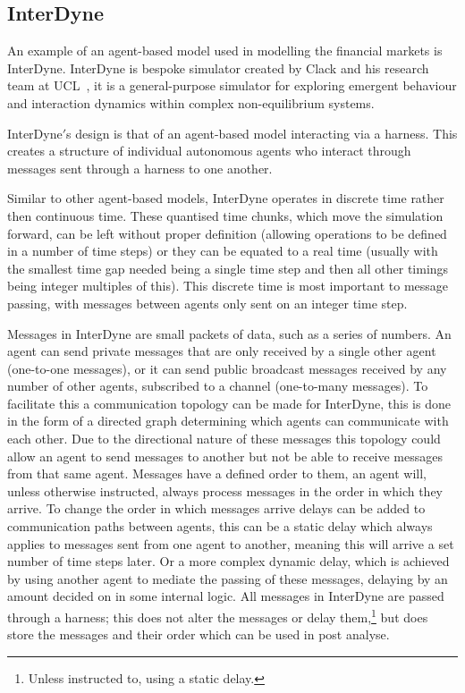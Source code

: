\documentclass{article}
\begin{document}
\subsection{InterDyne} \label{InterDyne_section}
An example of an agent-based model used in modelling the financial markets is InterDyne. InterDyne is bespoke simulator created by Clack and his research team at UCL~\cite{Chris_webPage}, it is a general-purpose simulator for exploring emergent behaviour and interaction dynamics within complex non-equilibrium systems.

InterDyne$'$s design is that of an agent-based model interacting via a harness. This creates a structure of individual autonomous agents who interact through messages sent through a harness to one another.
 
Similar to other agent-based models, InterDyne operates in discrete time rather then continuous time. These quantised time chunks, which move the simulation forward, can be left without proper definition (allowing operations to be defined in a number of time steps) or they can be equated to a real time (usually with the smallest time gap needed being a single time step and then all other timings being integer multiples of this). This discrete time is most important to message passing, with messages between agents only sent on an integer time step.

Messages in InterDyne are small packets of data, such as a series of numbers. An agent can send private messages that are only received by a single other agent (one-to-one messages), or it can send public broadcast messages received by any number of other agents, subscribed to a channel (one-to-many messages). To facilitate this a communication topology can be made for InterDyne, this is done in the form of a directed graph determining which agents can communicate with each other. Due to the directional nature of these messages this topology could allow an agent to send messages to another but not be able to receive messages from that same agent. Messages have a defined order to them, an agent will, unless otherwise instructed, always process messages in the order in which they arrive. To change the order in which messages arrive delays can be added to communication paths between agents, this can be a static delay which always applies to messages sent from one agent to another, meaning this will arrive a set number of time steps later. Or a more complex dynamic delay, which is achieved by using another agent to mediate the passing of these messages, delaying by an amount decided on in some internal logic. All messages in InterDyne are passed through a harness; this does not alter the messages or delay them,\footnote{Unless instructed to, using a static delay.} but does store the messages and their order which can be used in post analyse.
        
\end{document}
